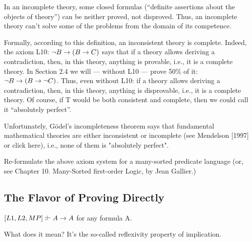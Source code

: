 In an incomplete theory, some closed formulas (``definite assertions about the objects of theory'') can be neither proved, not disproved. Thus, an incomplete theory can't solve some of the problems from the domain of its competence.

Formally, according to this definition, an inconsistent theory is complete. Indeed, the axiom L10: \(\neg B\rightarrow (B\rightarrow C)\) says that if a theory allows deriving a contradiction, then, in this theory, anything is provable, i.e., it is a complete theory. In Section 2.4 we will --- without L10 --- prove 50\% of it: \(\neg B\rightarrow (B\rightarrow \neg C)\). Thus, even without L10: if a theory allows deriving a contradiction, then, in this theory, anything is disprovable, i.e., it is a complete theory.  Of course, if T would be both consistent and complete, then we could call it ``absolutely perfect''.

Unfortunately, G\"{o}del's incompleteness theorem says that fundamental mathematical theories are
either inconsistent or incomplete (see Mendelson [1997] or click here), i.e., none of them is "absolutely
perfect".

\begin{exercise}
Re-formulate the above axiom system for a many-sorted predicate language (or, see Chapter 10. Many-Sorted first-order Logic, by Jean Gallier.)
\end{exercise}

\subsection{The Flavor of Proving Directly}

\begin{theorem}
\([L1, L2, MP]: \vdash A\rightarrow A\) for any formula A.
\end{theorem}
What does it mean? It's the so-called reflexivity property of implication.


